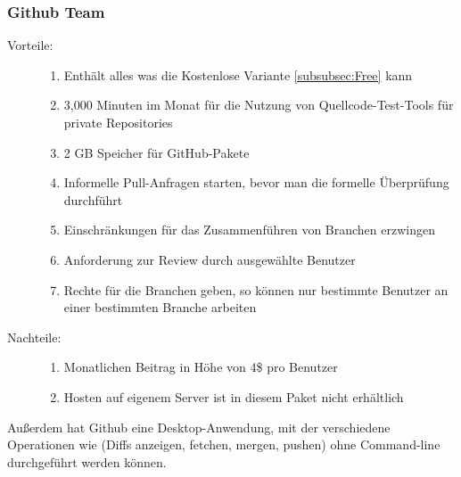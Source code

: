 \subsubsection{Github Team}
\label{subsubsec:Team}

\begin{description}
	\item [Vorteile:] \hfill
	\begin{enumerate}
		\item Enthält alles was die Kostenlose Variante \ref{subsubsec:Free} kann
		\item 3,000 Minuten im Monat für die Nutzung von Quellcode-Test-Tools für private Repositories
		\item 2 GB Speicher für GitHub-Pakete
		\item Informelle Pull-Anfragen starten, bevor man die formelle Überprüfung durchführt
		\item Einschränkungen für das Zusammenführen von Branchen erzwingen
		\item Anforderung zur Review durch ausgewählte Benutzer
		\item Rechte für die Branchen geben, so können nur bestimmte Benutzer an einer bestimmten Branche arbeiten
	\end{enumerate}
	\item [Nachteile:] \hfill
	\begin{enumerate}
		\item Monatlichen Beitrag in Höhe von 4\$ pro Benutzer
		\item Hosten auf eigenem Server ist in diesem Paket nicht erhältlich
	\end{enumerate}
\end{description}

Außerdem hat Github eine Desktop-Anwendung, mit der verschiedene Operationen wie (Diffs anzeigen, fetchen, mergen, pushen) ohne Command-line durchgeführt werden können.

